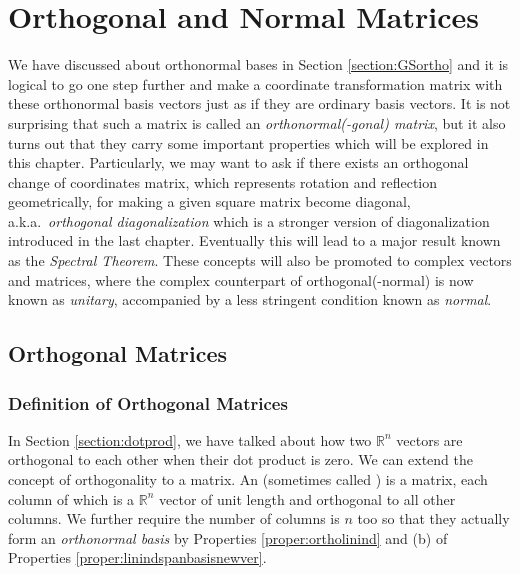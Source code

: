 \chapter{Orthogonal and Normal Matrices}

We have discussed about orthonormal bases in Section \ref{section:GSortho} and it is logical to go one step further and make a coordinate transformation matrix with these orthonormal basis vectors just as if they are ordinary basis vectors. It is not surprising that such a matrix is called an \textit{orthonormal(-gonal) matrix}, but it also turns out that they carry some important properties which will be explored in this chapter. Particularly, we may want to ask if there exists an orthogonal change of coordinates matrix, which represents rotation and reflection geometrically, for making a given square matrix become diagonal, a.k.a.\ \textit{orthogonal diagonalization} which is a stronger version of diagonalization introduced in the last chapter. Eventually this will lead to a major result known as the \textit{Spectral Theorem}. These concepts will also be promoted to complex vectors and matrices, where the complex counterpart of orthogonal(-normal) is now known as \textit{unitary}, accompanied by a less stringent condition known as \textit{normal}. 

\section{Orthogonal Matrices}
\subsection{Definition of Orthogonal Matrices}
In Section \ref{section:dotprod}, we have talked about how two $\mathbb{R}^n$ vectors are orthogonal to each other when their dot product is zero. We can extend the concept of orthogonality to a matrix. An  (sometimes called ) is a matrix, each column of which is a $\mathbb{R}^n$ vector of unit length and orthogonal to all other columns. We further require the number of columns is $n$ too so that they actually form an \textit{orthonormal basis} by Properties \ref{proper:ortholinind} and (b) of Properties \ref{proper:linindspanbasisnewver}. 

